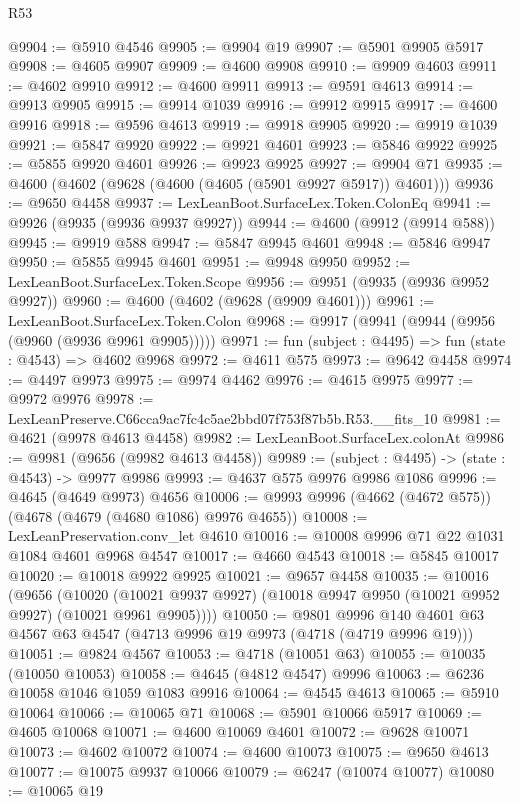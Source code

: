 \begin{lexlean}{R53}
\begin{coremodule}
@9904 := @5910 @4546
@9905 := @9904 @19
@9907 := @5901 @9905 @5917
@9908 := @4605 @9907
@9909 := @4600 @9908
@9910 := @9909 @4603
@9911 := @4602 @9910
@9912 := @4600 @9911
@9913 := @9591 @4613
@9914 := @9913 @9905
@9915 := @9914 @1039
@9916 := @9912 @9915
@9917 := @4600 @9916
@9918 := @9596 @4613
@9919 := @9918 @9905
@9920 := @9919 @1039
@9921 := @5847 @9920
@9922 := @9921 @4601
@9923 := @5846 @9922
@9925 := @5855 @9920 @4601
@9926 := @9923 @9925
@9927 := @9904 @71
@9935 := @4600 (@4602 (@9628 (@4600 (@4605 (@5901 @9927 @5917)) @4601)))
@9936 := @9650 @4458
@9937 := LexLeanBoot.SurfaceLex.Token.ColonEq
@9941 := @9926 (@9935 (@9936 @9937 @9927))
@9944 := @4600 (@9912 (@9914 @588))
@9945 := @9919 @588
@9947 := @5847 @9945 @4601
@9948 := @5846 @9947
@9950 := @5855 @9945 @4601
@9951 := @9948 @9950
@9952 := LexLeanBoot.SurfaceLex.Token.Scope
@9956 := @9951 (@9935 (@9936 @9952 @9927))
@9960 := @4600 (@4602 (@9628 (@9909 @4601)))
@9961 := LexLeanBoot.SurfaceLex.Token.Colon
@9968 := @9917 (@9941 (@9944 (@9956 (@9960 (@9936 @9961 @9905)))))
@9971 := fun (subject : @4495) => fun (state : @4543) => @4602 @9968
@9972 := @4611 @575
@9973 := @9642 @4458
@9974 := @4497 @9973
@9975 := @9974 @4462
@9976 := @4615 @9975
@9977 := @9972 @9976
@9978 := LexLeanPreserve.C66cca9ac7fc4c5ae2bbd07f753f87b5b.R53.__fits_10
@9981 := @4621 (@9978 @4613 @4458)
@9982 := LexLeanBoot.SurfaceLex.colonAt
@9986 := @9981 (@9656 (@9982 @4613 @4458))
@9989 := (subject : @4495) -> (state : @4543) -> @9977 @9986
@9993 := @4637 @575 @9976 @9986 @1086
@9996 := @4645 (@4649 @9973) @4656
@10006 := @9993 @9996 (@4662 (@4672 @575)) (@4678 (@4679 (@4680 @1086) @9976 @4655))
@10008 := LexLeanPreservation.conv_let @4610
@10016 := @10008 @9996 @71 @22 @1031 @1084 @4601 @9968 @4547
@10017 := @4660 @4543
@10018 := @5845 @10017
@10020 := @10018 @9922 @9925
@10021 := @9657 @4458
@10035 := @10016
    (@9656
      (@10020 (@10021 @9937 @9927) (@10018 @9947 @9950 (@10021 @9952 @9927) (@10021 @9961 @9905))))
@10050 := @9801
    @9996
    @140
    @4601
    @63
    @4567
    @63
    @4547
    (@4713 @9996 @19 @9973 (@4718 (@4719 @9996 @19)))
@10051 := @9824 @4567
@10053 := @4718 (@10051 @63)
@10055 := @10035 (@10050 @10053)
@10058 := @4645 (@4812 @4547) @9996
@10063 := @6236 @10058 @1046 @1059 @1083 @9916
@10064 := @4545 @4613
@10065 := @5910 @10064
@10066 := @10065 @71
@10068 := @5901 @10066 @5917
@10069 := @4605 @10068
@10071 := @4600 @10069 @4601
@10072 := @9628 @10071
@10073 := @4602 @10072
@10074 := @4600 @10073
@10075 := @9650 @4613
@10077 := @10075 @9937 @10066
@10079 := @6247 (@10074 @10077)
@10080 := @10065 @19

\end{coremodule}
\end{lexlean}

